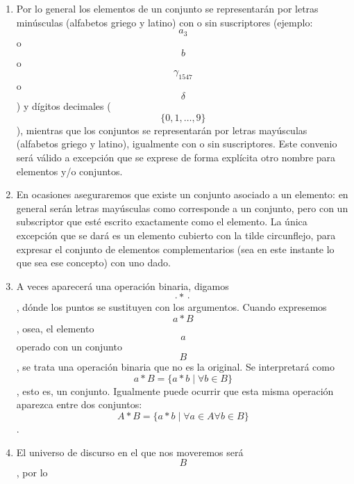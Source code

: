 \documentclass[
]{article}
\providecommand{\tightlist}{%
  \setlength{\itemsep}{0pt}\setlength{\parskip}{0pt}}
\begin{document}
\begin{enumerate}
\begin{enumerate}
    \begin{enumerate}
    \def\labelenumiii{\arabic{enumiii}.}
    \tightlist
    \item
      \begin{enumerate}
      \def\labelenumiv{\arabic{enumiv}.}
      \tightlist
      \item
        \[\lbrack 0,1\rbrack_{\mathbb{Q}}{: = {\lbrack 0,1\rbrack \cap \mathbb{Q}}}\].
      \item
        \[{\lbrack 0,1\rbrack_{\mathbb{Q}}}^{1}{: = \lbrack 0,1\rbrack_{\mathbb{Q}}}\].
      \item
        \[{\lbrack 0,1\rbrack_{\mathbb{Q}}}^{n}{: = {{\lbrack 0,1\rbrack_{\mathbb{Q}}}^{n - 1} \times {\lbrack 0,1\rbrack_{\mathbb{Q}}}^{1}}}\].
      \end{enumerate}
    \end{enumerate}
  \item
    Por lo general los elementos de un conjunto se representarán por
    letras minúsculas (alfa\-betos griego y latino) con o sin
    suscriptores (ejemplo:\[a_{3}\]o\[b\]o\[\gamma_{1547}\]o\[\delta\])
    y dí\-gitos decimales (\[\{{0,1,\ldots,9}\}\]), mientras que los
    conjuntos se representarán por letras mayúsculas (alfabetos griego y
    latino), igualmente con o sin suscriptores. Este convenio será
    válido a excepción que se exprese de forma explícita otro nombre
    para elementos y/o conjuntos.
  \item
    En ocasiones aseguraremos que existe un conjunto asociado a un
    elemento: en general serán letras mayúsculas como corresponde a un
    conjunto, pero con un subscriptor que esté escrito exactamente como
    el elemento. La única excepción que se dará es un elemento cubierto
    con la tilde circunflejo, para expresar el conjunto de elementos
    complementa\-rios (sea en este instante lo que sea ese concepto) con
    uno dado.
  \item
    A veces aparecerá una operación binaria,
    digamos\[{\cdot \ast} \cdot\], dónde los puntos se sustitu\-yen con
    los argumentos. Cuando expresemos \[a \ast B\] , osea, el elemento
    \[a\]operado con un conjunto \[B\], se trata una operación binaria
    que no es la original. Se interpreta\-rá como
    \[{a \ast B} = {\{{{a \ast b} \mid \forall{b \in B}}\}}\] , esto es,
    un conjunto. Igualmente puede ocurrir que esta misma operación
    aparezca entre dos conjuntos:
    \[{A \ast B} = {\{{{a \ast b} \mid {\forall{a \in A}\forall{b \in B}}}\}}\].
  \item
    El universo de discurso en el que nos moveremos será\[B\], por lo

\end{enumerate}
\end{enumerate}
\end{document}
